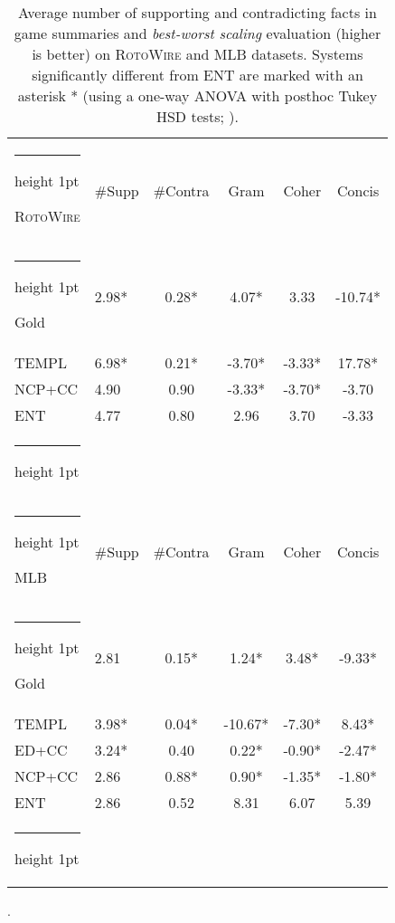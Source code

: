 \documentclass[11pt,a4paper]{article}
\makeatletter
\newcommand{\thickhline}{\noalign {\ifnum 0=`}\fi \hrule height 1pt
    \futurelet \reserved@a \@xhline
}
\makeatother
\begin{document}
\begin{table}[t]
\small
\centering
\begin{tabular}{@{~}l@{~~}l@{~~}c@{~~}c@{~~}c@{~~}c@{~}}
\thickhline 
\textsc{RotoWire} & \#Supp & \#Contra & Gram & Coher & Concis \\
\thickhline 
Gold    & 2.98* & \hspace*{.15cm}0.28* & \hspace*{.1cm}4.07* & \hspace*{-.15cm}3.33& \hspace*{-.1cm}-10.74* \\
TEMPL   & 6.98* & \hspace*{.15cm}0.21* & -3.70*& \hspace*{-.1cm}-3.33* & 17.78*\\
NCP+CC  & 4.90 & 0.90 & -3.33* & \hspace*{-.1cm}-3.70*&\hspace*{-.1cm}-3.70\\
ENT  & 4.77 & 0.80 & 2.96 & \hspace*{-.15cm}3.70&\hspace*{-.1cm}-3.33\\ \thickhline
\multicolumn{6}{c}{} \\
\thickhline 
MLB & \#Supp & \#Contra & Gram & Coher & Concis \\ \thickhline
Gold    & 2.81 & 0.15* & \hspace*{.3cm}1.24* & \hspace*{.1cm}3.48* & -9.33* \\
TEMPL   & 3.98* & 0.04* & -10.67* & -7.30*& \hspace*{.1cm}8.43* \\
ED+CC & 3.24* & \hspace*{-.15cm}0.40 & \hspace*{.3cm}0.22* & -0.90* & -2.47*  \\
NCP+CC  & 2.86 & 0.88* & \hspace*{.3cm}0.90* & -1.35*& -1.80* \\
ENT  & 2.86 & \hspace*{-.15cm}0.52 & \hspace*{.13cm}8.31 & 6.07 &\hspace*{-.05cm}5.39\\
\thickhline 
\end{tabular} 
\caption{Average number of supporting and contradicting facts
  in game summaries and   \textit{best-worst scaling}
  evaluation (higher is better) on \textsc{RotoWire} and MLB datasets. 
  Systems significantly different from ENT are marked with an asterisk * (using a one-way ANOVA with
  posthoc Tukey HSD tests; \mbox{}).}.
  \label{tbl:mlb-human-eval}
\end{table}
\end{document}
